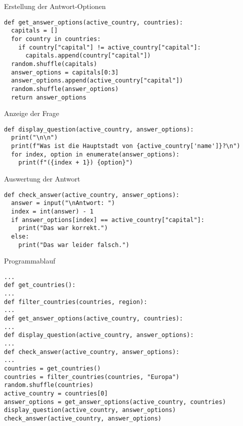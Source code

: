 \begin{fragile}
	
\begin{block}{Erstellung der Antwort-Optionen}
\vspace{2pt}
\begin{verbatim}
def get_answer_options(active_country, countries):
  capitals = []
  for country in countries:
    if country["capital"] != active_country["capital"]:
      capitals.append(country["capital"])
  random.shuffle(capitals)
  answer_options = capitals[0:3]
  answer_options.append(active_country["capital"])
  random.shuffle(answer_options)
  return answer_options
\end{verbatim}
\end{block}

\end{fragile}

\begin{fragile}
\begin{block}{Anzeige der Frage}
\vspace{2pt}
\begin{verbatim}
def display_question(active_country, answer_options):
  print("\n\n")
  print(f"Was ist die Hauptstadt von {active_country['name']}?\n")
  for index, option in enumerate(answer_options):
    print(f"({index + 1}) {option}")
\end{verbatim}
\end{block}

\vspace{12pt}
\pause 

\begin{block}{Auswertung der Antwort}
	\vspace{2pt}
	\begin{verbatim}
def check_answer(active_country, answer_options):
  answer = input("\nAntwort: ")
  index = int(answer) - 1
  if answer_options[index] == active_country["capital"]:
    print("Das war korrekt.")
  else:
    print("Das war leider falsch.")
\end{verbatim}
\end{block}

\end{fragile}


\begin{fragile}
\begin{block}{Programmablauf}
\vspace{2pt}
\begin{verbatim}
...	
def get_countries():
...
def filter_countries(countries, region):
...
def get_answer_options(active_country, countries):
...
def display_question(active_country, answer_options):
...
def check_answer(active_country, answer_options):
...
countries = get_countries()
countries = filter_countries(countries, "Europa")
random.shuffle(countries)
active_country = countries[0]
answer_options = get_answer_options(active_country, countries)
display_question(active_country, answer_options)
check_answer(active_country, answer_options)	
\end{verbatim}
\end{block}
\end{fragile}


